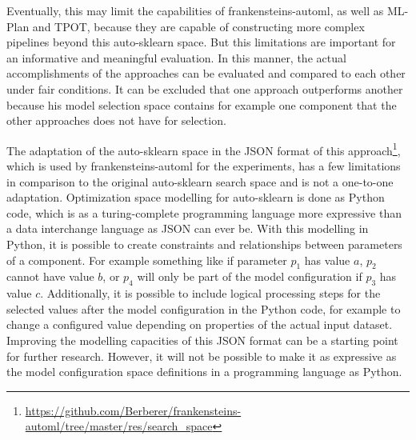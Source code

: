 Eventually, this may limit the capabilities of frankensteins-automl, as well as ML-Plan and TPOT, because they are capable of constructing more complex pipelines beyond this auto-sklearn space.
But this limitations are important for an informative and meaningful evaluation.\newline
In this manner, the actual accomplishments of the approaches can be evaluated and compared to each other under fair conditions.
It can be excluded that one approach outperforms another because his model selection space contains for example one component that the other approaches does not have for selection.

The adaptation of the auto-sklearn space in the JSON format of this approach\footnote{\url{https://github.com/Berberer/frankensteins-automl/tree/master/res/search_space}}, which is used by frankensteins-automl for the experiments, has a few limitations in comparison to the original auto-sklearn search space and is not a one-to-one adaptation.
Optimization space modelling for auto-sklearn is done as Python code, which is as a turing-complete programming language more expressive than a data interchange language as JSON can ever be.
With this modelling in Python, it is possible to create constraints and relationships between parameters of a component.
For example something like if parameter $p_1$ has value $a$, $p_2$ cannot have value $b$, or $p_4$ will only be part of the model configuration if $p_3$ has value $c$.\newline
Additionally, it is possible to include logical processing steps for the selected values after the model configuration in the Python code, for example to change a configured value depending on properties of the actual input dataset.\newline
Improving the modelling capacities of this JSON format can be a starting point for further research.
However, it will not be possible to make it as expressive as the model configuration space definitions in a programming language as Python.

